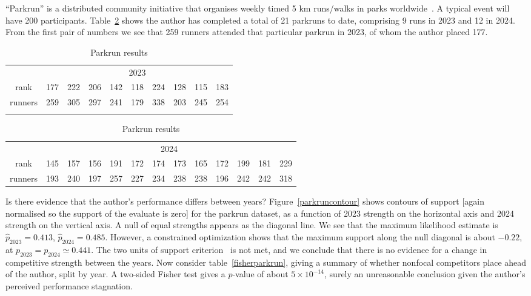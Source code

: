\documentclass[article]{ajs}
\begin{document}
``Parkrun'' is a distributed community initiative that organises
weekly timed 5 km runs/walks in parks worldwide~\citep{hindley2020}.
A typical event will have 200 participants.  Table~\ref{parkruntable}
shows the author has completed a total of 21 parkruns to date,
comprising 9 runs in 2023 and 12 in 2024.  From the first pair of
numbers we see that 259 runners attended that particular parkrun in
2023, of whom the author placed 177.

\begin{table}[t]
  \centering
  \caption{Parkrun results}
\label{parkruntable}
\begin{tabular}{cccccccccc}\\
 & \multicolumn{9}{c}{2023}\\
rank   & 177& 222& 206& 142& 118& 224& 128& 115& 183\\
runners& 259& 305& 297& 241& 179& 338& 203& 245& 254\\ \\
\end{tabular}
\begin{tabular}{ccccccccccccc}
  & \multicolumn{12}{c}{2024}\\
rank      &  145& 157& 156& 191& 172& 174& 173& 165& 172& 199& 181& 229\\
runners   &  193& 240& 197& 257& 227& 234& 238& 238& 196& 242& 242& 318\\
\end{tabular}
\end{table}

Is there evidence that the author's performance differs between years?
Figure~\ref{parkruncontour} shows contours of support [again
  normalised so the support of the evaluate is zero] for the parkrun
dataset, as a function of 2023 strength on the horizontal axis and
2024 strength on the vertical axis.  A null of equal strengths appears
as the diagonal line.  We see that the maximum likelihood estimate is
$\hat{p}_\mathrm{2023}=0.413$, $\hat{p}_\mathrm{2024}=0.485$.
However, a constrained optimization shows that the maximum support
along the null diagonal is about $-0.22$, at
${p}_\mathrm{2023}={p}_\mathrm{2024}\simeq 0.441$.  The two units of
support criterion~\citep{edwards1992} is not met, and we conclude that
there is no evidence for a change in competitive strength between the
years.  Now consider table~\ref{fisherparkrun}, giving a summary of
whether nonfocal competitors place ahead of the author, split by year.
A two-sided Fisher test gives a $p$-value of about $5\times 10^{-14}$,
surely an unreasonable conclusion given the author's perceived
performance stagnation.
\end{document}
